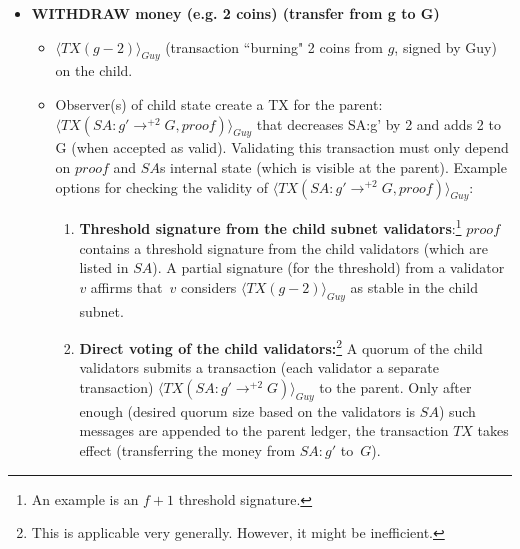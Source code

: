 \begin{itemize}
    \item \textbf{WITHDRAW money (e.g. 2 coins) (transfer from g to G)}
    \begin{itemize}
        \item $\langle TX(g-2)\rangle_{Guy}$ (transaction ``burning" 2 coins from $g$, signed by Guy) on the child.
        \item Observer(s) of child state create a TX for the parent:  $\langle TX(SA:g' \rightarrow^{+2} G, proof)\rangle_{Guy}$ that decreases SA:g' by 2 and adds 2 to G (when accepted as valid). Validating this transaction must only depend on $proof$ and $SA$s internal state (which is visible at the parent).
        Example options for checking the validity of $\langle TX(SA:g' \rightarrow^{+2} G, proof)\rangle_{Guy}$:
        \begin{enumerate}
            \item \textbf{Threshold signature from the child subnet validators}:\footnote{An example is an $f+1$ threshold signature.}
            $proof$ contains a threshold signature from the child validators (which are listed in $SA$). A partial signature (for the threshold) from a validator~$v$ affirms that~$v$ considers $\langle TX(g-2)\rangle_{Guy}$ as stable in the child subnet.
            \item \textbf{Direct voting of the child validators:}\footnote{This is applicable very generally. However, it might be inefficient.}
            A quorum of the child validators submits a transaction (each validator a separate transaction) $\langle TX(SA:g' \rightarrow^{+2} G)\rangle_{Guy}$ to the parent. Only after enough (desired quorum size based on the validators is $SA$) such messages are appended to the parent ledger, the transaction $TX$ takes effect (transferring the money from $SA:g'$ to~$G$).
        \end{enumerate}
    \end{itemize}
    

\end{itemize}
